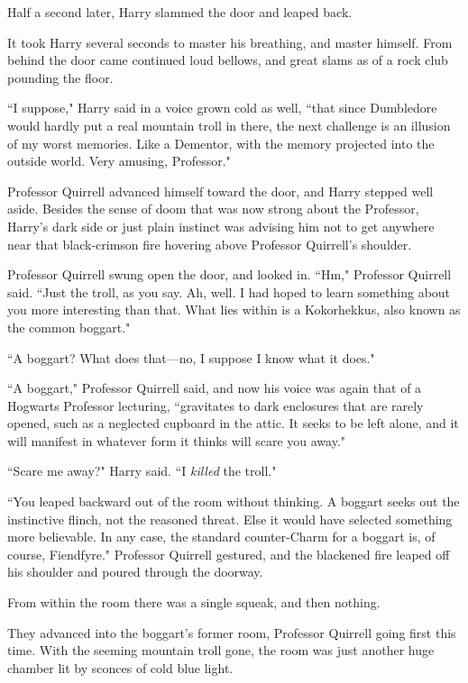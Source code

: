 \later

Half a second later, Harry slammed the door and leaped back.

It took Harry several seconds to master his breathing, and master himself. From behind the door came continued loud bellows, and great slams as of a rock club pounding the floor.

``I suppose," Harry said in a voice grown cold as well, ``that since Dumbledore would hardly put a real mountain troll in there, the next challenge is an illusion of my worst memories. Like a Dementor, with the memory projected into the outside world. Very amusing, Professor."

Professor Quirrell advanced himself toward the door, and Harry stepped well aside. Besides the sense of doom that was now strong about the Professor, Harry's dark side or just plain instinct was advising him not to get anywhere near that black-crimson fire hovering above Professor Quirrell's shoulder.

Professor Quirrell swung open the door, and looked in. ``Hm," Professor Quirrell said. ``Just the troll, as you say. Ah, well. I had hoped to learn something about you more interesting than that. What lies within is a Kokorhekkus, also known as the common boggart."

``A boggart? What does that—no, I suppose I know what it does."

``A boggart," Professor Quirrell said, and now his voice was again that of a Hogwarts Professor lecturing, ``gravitates to dark enclosures that are rarely opened, such as a neglected cupboard in the attic. It seeks to be left alone, and it will manifest in whatever form it thinks will scare you away."

``Scare me away?" Harry said. ``I \emph{killed} the troll."

``You leaped backward out of the room without thinking. A boggart seeks out the instinctive flinch, not the reasoned threat. Else it would have selected something more believable. In any case, the standard counter-Charm for a boggart is, of course, Fiendfyre." Professor Quirrell gestured, and the blackened fire leaped off his shoulder and poured through the doorway.

From within the room there was a single squeak, and then nothing.

They advanced into the boggart's former room, Professor Quirrell going first this time. With the seeming mountain troll gone, the room was just another huge chamber lit by sconces of cold blue light.

